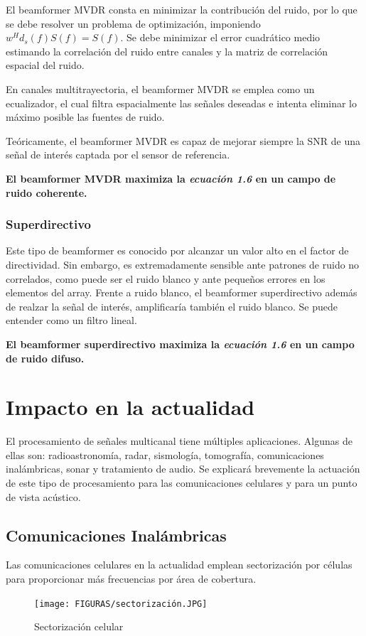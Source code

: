 \documentclass[a4paper,11pt]{book}
\begin{document}
	El beamformer MVDR consta en minimizar la contribución del ruido, por lo que se debe resolver un problema de optimización, imponiendo $w^{H} d_{s}(f) S(f) = S(f)$. Se debe minimizar el error cuadrático medio estimando la correlación del ruido entre canales y la matriz de correlación espacial del ruido.
	
	En canales multitrayectoria, el beamformer MVDR se emplea como un ecualizador, el cual filtra espacialmente las señales deseadas e intenta eliminar lo máximo posible las fuentes de ruido.
	
	Teóricamente, el beamformer MVDR es capaz de mejorar siempre la SNR de una señal de interés captada por el sensor de referencia.
	
	\textbf{		El beamformer MVDR maximiza la \textit{ecuación 1.6} en un campo de ruido coherente.}
	
	\subsubsection{Superdirectivo}
	Este tipo de beamformer es conocido por alcanzar un valor alto en el factor de directividad. Sin embargo, es extremadamente sensible ante patrones de ruido no correlados, como puede ser el ruido blanco y ante pequeños errores en los elementos del array. Frente a ruido blanco, el beamformer superdirectivo además de realzar la señal de interés, amplificaría también el ruido blanco. Se puede entender como un filtro lineal.
	
	\textbf{		El beamformer superdirectivo maximiza la \textit{ecuación 1.6} en un campo de ruido difuso.}
	
	\section{Impacto en la actualidad}
	El procesamiento de señales multicanal tiene múltiples aplicaciones. Algunas de ellas son: radioastronomía, radar, sismología, tomografía, comunicaciones inalámbricas, sonar y tratamiento de audio. Se explicará brevemente la actuación de este tipo de procesamiento para las comunicaciones celulares y para un punto de vista acústico.
		\subsection{Comunicaciones Inalámbricas}
		Las comunicaciones celulares en la actualidad emplean sectorización por células para proporcionar más frecuencias por área de cobertura.
		\begin{figure}[hbtp]
		\centering
		\texttt{[image: FIGURAS/sectorización.JPG]}
		\caption{Sectorización celular}
		\end{figure}
		
\end{document}
